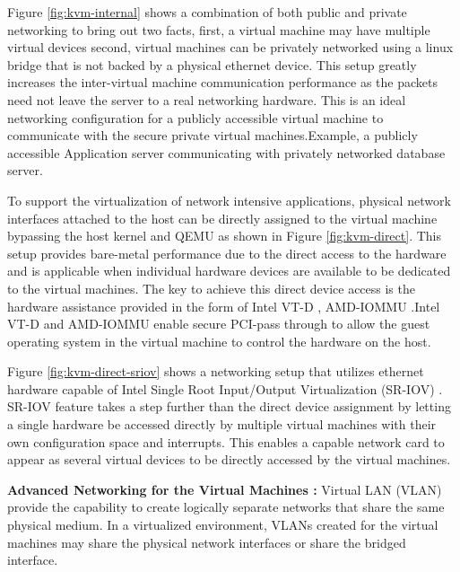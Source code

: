 \begin{enumerate}
Figure \ref{fig:kvm-internal} shows a combination of both public and private networking to bring out two facts, first, a virtual machine may have multiple virtual devices second, virtual machines can be privately networked using a linux bridge that is not backed by a physical ethernet device. This setup greatly increases the inter-virtual machine communication performance as the packets need not leave the server to a real networking hardware. This is an ideal networking configuration for a publicly accessible virtual machine to communicate with the secure private virtual machines.Example, a publicly accessible Application server communicating with privately networked database server.



To support the virtualization of network intensive applications, physical network interfaces attached to the host can be directly assigned to the virtual machine bypassing the host kernel and QEMU as shown in Figure \ref{fig:kvm-direct}. This setup provides bare-metal performance due to the direct access to the hardware and is applicable when individual hardware devices are available to be dedicated to the virtual machines. The key to achieve this direct device access is the hardware assistance provided in the form of Intel VT-D \cite{intelvtd}, AMD-IOMMU \cite{amd-iommu}.Intel VT-D and AMD-IOMMU enable secure PCI-pass through to allow the guest operating system in the virtual machine to control the hardware on the host.



Figure \ref{fig:kvm-direct-sriov} shows a networking setup that utilizes ethernet hardware capable of Intel Single Root Input/Output Virtualization (SR-IOV) \cite{sr-iov_primer}. SR-IOV feature takes a step further than the direct device assignment by letting a single hardware be accessed directly by multiple virtual machines with their own configuration space and interrupts. This enables a capable network card to appear as several virtual devices to be directly accessed by the virtual machines.


\textbf{Advanced Networking for the Virtual Machines : }  Virtual LAN (VLAN) provide the capability to create logically separate networks that share the same physical medium. In a virtualized environment, VLANs created for the virtual machines may share the physical network interfaces or share the bridged interface.


\end{enumerate}


